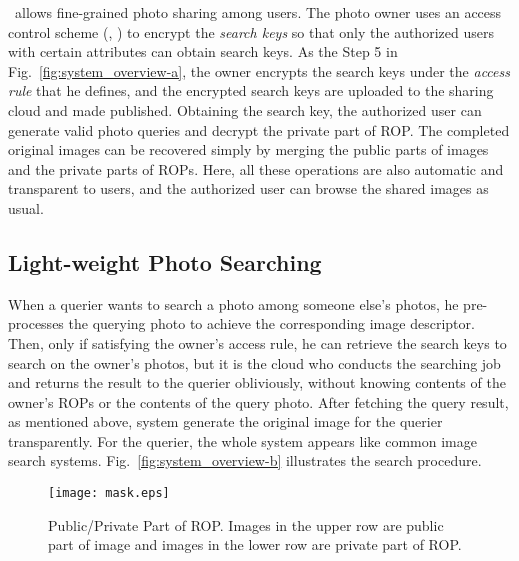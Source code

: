 \ourprotocolNSP~allows fine-grained photo sharing among users. The photo owner uses an access control scheme (\eg, \cite{bethencourt2007ciphertext, chase2009improving}) to encrypt the \textit{search keys} so that only the authorized users with certain attributes can obtain search keys.
As the Step 5 in Fig.~\ref{fig:system_overview-a}, the owner encrypts the search keys under the \textit{access rule} that he defines,
 and the encrypted search keys are uploaded to the sharing cloud and made published.
Obtaining the search key, the authorized user can generate valid photo queries and decrypt the private part of ROP.
The completed original images can be recovered simply by merging the public parts of images and the private parts of ROPs.
Here, all these operations are also automatic and transparent to users, and the authorized user can browse the shared images as usual.


\vspace{-0.05in}
\subsection{Light-weight Photo Searching}
\vspace{-0.05in}
When a querier wants to search a photo among someone else's photos, he
pre-processes the querying photo to achieve the corresponding image
descriptor. Then, only if satisfying the owner's access rule, he can
retrieve the search keys to search on the owner's photos, but it is
the cloud who conducts the searching job and returns the result to the
querier obliviously, \ie without knowing contents of the owner's ROPs
or the contents of the query photo. After fetching the query result,
as mentioned above, system generate the original image for the querier transparently.
For the querier, the whole system appears like common image search systems.
Fig.~\ref{fig:system_overview-b} illustrates the search procedure.

\begin{figure}[t!]
\begin{center}
\texttt{[image: mask.eps]}\vspace{-5pt}
\caption{Public/Private Part of ROP. Images in the upper row are public part of image and images in the lower row are private part of ROP.}\vspace{-20pt}
\label{fig:mask}
\end{center}
\end{figure}

\vspace{-0.05in}
